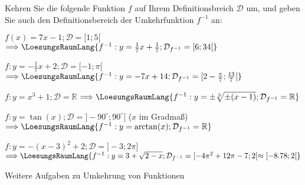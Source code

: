 

\renewcommand{\bbwAufgabenBlockID}{Finv}

\renewcommand{\metaHeaderLine}{Funktionen}
\renewcommand{\arbeitsblattTitel}{Umkehrfunktionen}



\arbeitsblattHeader{}

Kehren Sie die folgende Funktion $f$ auf Ihrem Definitionsbreich
$\mathcal{D}$ um, und geben Sie auch den Definitionsbereich der
Umkehrfunktion $f^{-1}$ an:


\begin{bbwAufgabenBlock}
\item $f(x) = 7x-1; \mathcal{D} = [1;5[$
$\Longrightarrow \LoesungsRaumLang{
f^{-1}: y=\frac17 x + \frac17; \mathcal{D}_{f^{-1}} = [6;34[
}$

\item $f:  y = -\frac17x + 2; \mathcal{D} = [-1;\pi[$
$\Longrightarrow \LoesungsRaumLang{
f^{-1}: y=-7x+14; \mathcal{D}_{f^{-1}} = [2-\frac{\pi}{7};\frac{13}{7}[
}$

\item $f:  y = x^3  + 1; \mathcal{D} = \mathbb{R}$
$\Longrightarrow \LoesungsRaumLang{
f^{-1}: y=\pm\sqrt[3]{\pm(x-1)}; \mathcal{D}_{f^{-1}} = \mathbb{R}
}$\noTRAINER{\newpage}

\item $f:  y = \tan(x); \mathcal{D} = ]-90^{\circ};90^{\circ}[$ ($x$ im Gradmaß)
$\Longrightarrow \LoesungsRaumLang{
f^{-1}: y=\arctan(x); \mathcal{D}_{f^{-1}} = \mathbb{R}
}$

\item $f:  y = -(x-3)^2 + 2; \mathcal{D} = ]-3;2\pi]$
$\Longrightarrow \LoesungsRaumLang{
f^{-1}: y=3+\sqrt{2-x}; \mathcal{D}_{f^{-1}} = [-4\pi^2+12\pi-7;2[
\approx{} [-8.78;2[
}$

\end{bbwAufgabenBlock}
\noTRAINER{\newpage}



Weitere Aufgaben zu Umkehrung von Funktionen

